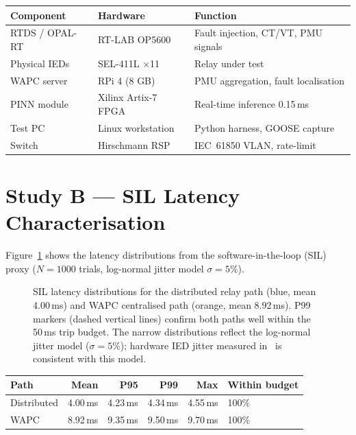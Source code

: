 \documentclass[11pt,a4paper]{article}
\begin{document}
\begin{center}
\begin{tabular}{@{}lll@{}}
\toprule
Component & Hardware & Function \\
\midrule
RTDS / OPAL-RT & RT-LAB OP5600 & Fault injection, CT/VT, PMU signals \\
Physical IEDs & SEL-411L $\times$11 & Relay under test \\
WAPC server & RPi 4 (8 GB) & PMU aggregation, fault localisation \\
PINN module & Xilinx Artix-7 FPGA & Real-time inference 0.15\,ms \\
Test PC & Linux workstation & Python harness, GOOSE capture \\
Switch & Hirschmann RSP & IEC~61850 VLAN, rate-limit \\
\bottomrule
\end{tabular}
\end{center}

\section{Study B --- SIL Latency Characterisation}
\label{sec:studyB}

Figure~\ref{fig:timing} shows the latency distributions from the
software-in-the-loop (SIL) proxy ($N=1000$ trials, log-normal jitter
model $\sigma=5\%$).

\begin{figure}[htbp]
  \centering
  \resizebox{0.96\textwidth}{!}{}
  \caption{SIL latency distributions for the distributed relay path (blue,
           mean 4.00\,ms) and WAPC centralised path (orange, mean 8.92\,ms).
           P99 markers (dashed vertical lines) confirm both paths well within
           the 50\,ms trip budget.  The narrow distributions reflect the
           log-normal jitter model ($\sigma=5\%$); hardware IED jitter
           measured in~\cite{Denegri2019} is consistent with this model.}
  \label{fig:timing}
\end{figure}

\begin{center}
\begin{tabular}{@{}lrrrrl@{}}
\toprule
Path & Mean & P95 & P99 & Max & Within budget \\
\midrule
Distributed & 4.00\,ms & 4.23\,ms & 4.34\,ms & 4.55\,ms & 100\% \\
WAPC & 8.92\,ms & 9.35\,ms & 9.50\,ms & 9.70\,ms & 100\% \\
\bottomrule
\end{tabular}
\end{center}
\end{document}
